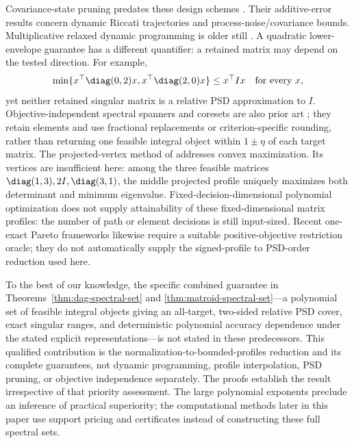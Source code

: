 Covariance-state pruning predates these design schemes
\citep{Vitus2012,Atanasov2014}. Their additive-error results concern dynamic
Riccati trajectories and process-noise/covariance bounds. Multiplicative
relaxed dynamic programming is older still
\citep{Alriksson2005,Lincoln2006}. A quadratic lower-envelope guarantee has
a different quantifier: a retained matrix may depend on the tested direction.
For example,
\[
 \min\{x^\top\diag(0,2)x,x^\top\diag(2,0)x\}\le x^\top Ix
 \quad\text{for every }x,
\]
yet neither retained singular matrix is a relative PSD approximation to $I$.
Objective-independent spectral spanners and coresets are also prior art
\citep{Indyk2020,Mahabadi2026}; they retain elements and use fractional
replacements or criterion-specific rounding, rather than returning one
feasible integral object within $1\pm\eta$ of each target matrix.
The projected-vertex method of \citet{Onn2004} addresses convex
maximization. Its vertices are insufficient here: among the three
feasible matrices $\diag(1,3),2I,\diag(3,1)$, the middle projected profile
uniquely maximizes both determinant and minimum eigenvalue.
Fixed-decision-dimensional polynomial optimization \citep{DeLoera2008}
does not supply attainability of these fixed-dimensional matrix profiles:
the number of path or element decisions is still input-sized. Recent
one-exact Pareto frameworks \citep{Bokler2026} likewise require a suitable
positive-objective restriction oracle; they do not automatically supply
the signed-profile to PSD-order reduction used here.

To the best of our knowledge, the specific combined guarantee in
Theorems~\ref{thm:dag-spectral-set} and \ref{thm:matroid-spectral-set}---a
polynomial set of feasible integral objects giving an all-target, two-sided
relative PSD cover, exact singular ranges, and deterministic polynomial
accuracy dependence under the stated explicit representations---is not
stated in these predecessors. This qualified contribution is the
normalization-to-bounded-profiles reduction and its complete guarantees,
not dynamic programming, profile interpolation, PSD pruning, or objective
independence separately. The proofs establish the result irrespective of
that priority assessment. The large polynomial exponents preclude an
inference of practical superiority; the computational methods later in this
paper use support pricing and certificates instead of constructing these
full spectral sets.
